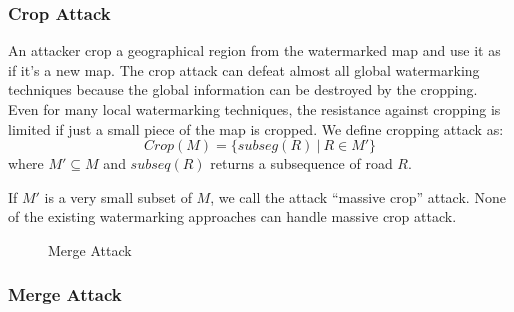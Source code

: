 \subsubsection*{Crop Attack}
An attacker crop a geographical region from the watermarked map and use it 
as if it's a new map. The crop attack can defeat almost all global 
watermarking techniques because the global information can be destroyed 
by the cropping. %
Even for many local watermarking techniques, the resistance against cropping
is limited if just a small piece of the map is cropped.
We define cropping attack as:
\[
Crop(M) = \{ subseg(R) ~|~ R \in M'\}
\]
where 
$M' \subseteq M$ and $subseq (R)$ returns a subsequence of road $R$.

If $M'$ is a very small subset of $M$, we call the attack ``massive crop'' attack.
None of the existing watermarking approaches can handle massive crop attack.

\begin{figure}[th]
\centering
{}
\caption{Merge Attack}
\label{fig:merge}
\end{figure}


\subsubsection*{Merge Attack}

